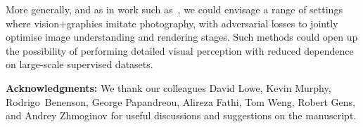 \documentclass[runningheads]{llncs}
\begin{document}
More generally, and as in work such as~\cite{tung2017adversarial}, we could envisage a range of settings where vision+graphics imitate photography, with adversarial losses to jointly optimise image understanding and rendering stages. Such methods could open up the possibility of performing detailed visual perception with reduced dependence on large-scale supervised datasets.


\vspace{4mm}

\noindent\textbf{Acknowledgments:} 
We thank our colleagues David Lowe,  Kevin Murphy, \mbox{Rodrigo Benenson}, George Papandreou,  Alireza Fathi, Tom Weng, Robert Gens, and Andrey Zhmoginov for useful discussions and suggestions on the manuscript.

\clearpage



\end{document}

